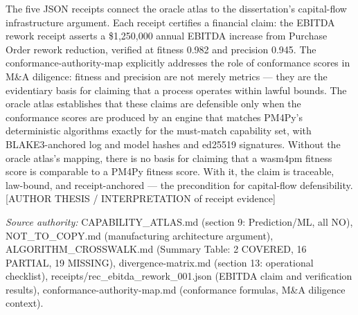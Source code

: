 The five JSON receipts connect the oracle atlas to the dissertation's capital-flow
infrastructure argument. Each receipt certifies a financial claim: the EBITDA rework
receipt asserts a \$1,250,000 annual EBITDA increase from Purchase Order rework reduction,
verified at fitness 0.982 and precision 0.945. The conformance-authority-map explicitly
addresses the role of conformance scores in M\&A diligence: fitness and precision are
not merely metrics --- they are the evidentiary basis for claiming that a process operates
within lawful bounds. The oracle atlas establishes that these claims are defensible only
when the conformance scores are produced by an engine that matches PM4Py's deterministic
algorithms exactly for the must-match capability set, with BLAKE3-anchored log and model
hashes and ed25519 signatures. Without the oracle atlas's mapping, there is no basis for
claiming that a wasm4pm fitness score is comparable to a PM4Py fitness score. With it,
the claim is traceable, law-bound, and receipt-anchored --- the precondition for
capital-flow defensibility. [AUTHOR THESIS / INTERPRETATION of receipt evidence]

\bigskip
\noindent\textit{Source authority:} CAPABILITY\_ATLAS.md (section 9: Prediction/ML, all
NO), NOT\_TO\_COPY.md (manufacturing architecture argument), ALGORITHM\_CROSSWALK.md
(Summary Table: 2 COVERED, 16 PARTIAL, 19 MISSING), divergence-matrix.md (section 13:
operational checklist), receipts/rec\_ebitda\_rework\_001.json (EBITDA claim and
verification results), conformance-authority-map.md (conformance formulas, M\&A
diligence context).
